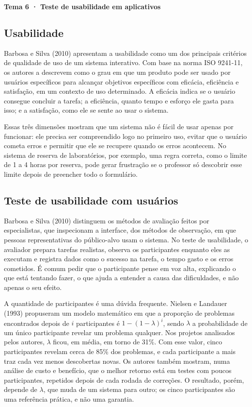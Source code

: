 \documentclass[a4paper,12pt]{article}
\begin{document}
\textbf{Tema 6 · Teste de usabilidade em aplicativos}

\subsection*{Usabilidade}

Barbosa e Silva (2010) apresentam a usabilidade como um dos principais
critérios de qualidade de uso de um sistema interativo. Com base na
norma ISO 9241-11, os autores a descrevem como o grau em que um produto
pode ser usado por usuários específicos para alcançar objetivos
específicos com eficácia, eficiência e satisfação, em um contexto de uso
determinado. A eficácia indica se o usuário consegue concluir a tarefa;
a eficiência, quanto tempo e esforço ele gasta para isso; e a
satisfação, como ele se sente ao usar o sistema.

Essas três dimensões mostram que um sistema não é fácil de usar apenas
por funcionar: ele
precisa ser compreendido logo no primeiro uso, evitar que o usuário
cometa erros e permitir que ele se recupere quando os erros acontecem.
No sistema de reserva de laboratórios, por exemplo, uma regra correta,
como o limite de 1 a 4 horas por reserva, pode gerar frustração se o
professor só descobrir esse limite depois de preencher todo o
formulário.

\subsection*{Teste de usabilidade com usuários}

Barbosa e Silva (2010) distinguem os métodos de avaliação feitos por
especialistas, que inspecionam a interface, dos métodos de observação,
em que pessoas representativas do público-alvo usam o sistema. No teste
de usabilidade, o avaliador prepara tarefas realistas, observa os
participantes enquanto eles as executam e registra dados como o sucesso
na tarefa, o tempo gasto e os erros cometidos. É comum pedir que o
participante pense em voz alta, explicando o que está tentando fazer, o
que ajuda a entender a causa das dificuldades, e não apenas o seu
efeito.

A quantidade de participantes é uma dúvida frequente. Nielsen e
Landauer (1993) propuseram um modelo matemático em que a proporção de
problemas encontrados depois de $i$ participantes é
$1-(1-\lambda)^{i}$, sendo $\lambda$ a probabilidade de um único
participante revelar um problema qualquer. Nos projetos analisados
pelos autores, $\lambda$ ficou, em média, em torno de 31\%. Com esse
valor, cinco participantes revelam cerca de 85\% dos problemas, e cada
participante a mais traz cada vez menos descobertas novas. Os autores
também mostram, numa análise de custo e benefício, que o melhor retorno
está em testes com poucos participantes, repetidos depois de cada
rodada de correções. O resultado, porém, depende de $\lambda$, que muda
de um sistema para outro; os cinco participantes são uma referência
prática, e não uma garantia.
\end{document}
